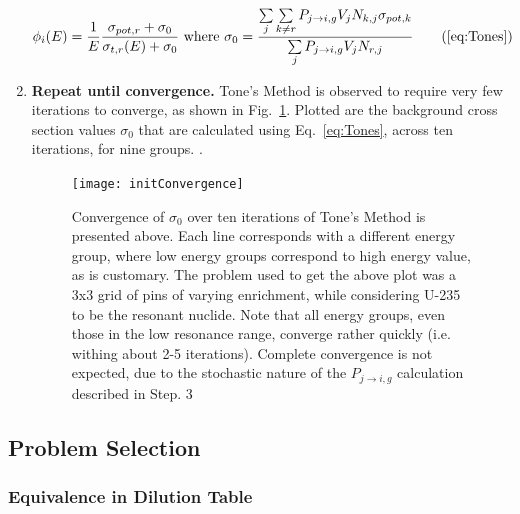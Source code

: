 \documentclass[10pt]{article}
\begin{document}
\begin{enumerate}
           \begin{equation}\phi_i(E)=\frac{1}{E}\frac{\sigma_{pot,r}+\sigma_{0}}{\sigma_{t,r}(E)+\sigma_{0}}~\mbox{where }\sigma_{0}=\frac{\sum\limits_j\sum\limits_{k\neq r}P_{j\rightarrow i,g}V_{j}N_{k,j}\sigma_{pot,k}}{\sum\limits_jP_{j\rightarrow i,g}V_{j}N_{r,j}}\tag{\ref{eq:Tones}}\end{equation}

         \item \textbf{Repeat until convergence.}
           Tone's Method is observed to require very few iterations to converge, as shown in Fig.~\ref{fig:initConvergence}. Plotted are the background cross section values $\sigma_0$ that are calculated using Eq.~\ref{eq:Tones}, across ten iterations, for nine groups. . 
            \begin{figure}[h]
              \begin{center}
              \texttt{[image: initConvergence]}
                \caption{Convergence of $\sigma_0$ over ten iterations of Tone's Method is presented above. Each line corresponds with a different energy group, where low energy groups correspond to high energy value, as is customary. The problem used to get the above plot was a 3x3 grid of pins of varying enrichment, while considering U-235 to be the resonant nuclide. Note that all energy groups, even those in the low resonance range, converge rather quickly (i.e. withing about 2-5 iterations). Complete convergence is not expected, due to the stochastic nature of the $P_{j\rightarrow i,g}$ calculation described in Step. 3}
              \label{fig:initConvergence}
              \end{center}
            \end{figure}


      \end{enumerate}




\subsection{Problem Selection}

\subsubsection{Equivalence in Dilution Table}
\end{document}
